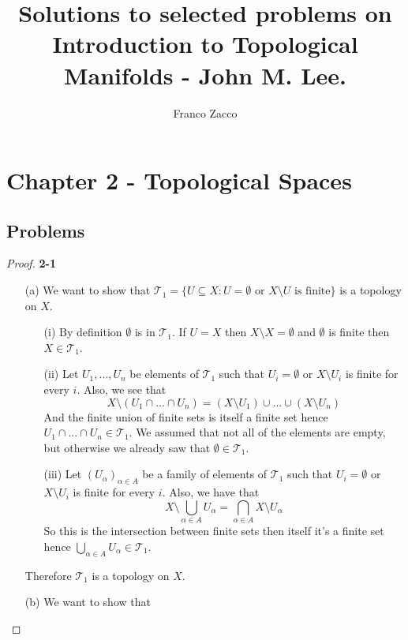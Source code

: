 \documentclass[11pt]{article}
\title{\textbf{Solutions to selected problems on Introduction to Topological Manifolds - John M. Lee.}}
\author{Franco Zacco}
\date{}
\newcommand{\Topo}{\mathcal{T}}
\theoremstyle{definition}
\begin{document}
\maketitle
\thispagestyle{empty}

\section*{Chapter 2 - Topological Spaces}

\subsection*{Problems}

\begin{proof}{\textbf{2-1}}
    \begin{itemize}
    \item [(a)] We want to show that
    $\Topo_1 = \{U \subseteq X: U = \emptyset \text{ or }X \setminus U \text{ is finite}\}$
    is a topology on $X$.
        \begin{itemize}
            \item [(i)] By definition $\emptyset$ is in $\Topo_1$. If $U = X$
            then $X \setminus X = \emptyset$ and $\emptyset$ is finite then
            $X \in \Topo_1$.
            \item [(ii)] Let $U_1, ..., U_n$ be elements of $\Topo_1$ such that
            $U_i = \emptyset$ or $X \setminus U_i$ is finite for every
            $i$. Also, we see that 
            $$X \setminus (U_1 \cap ... \cap U_n)
            = (X \setminus U_1) \cup ... \cup (X \setminus U_n)$$
            And the finite union of finite sets is 
            itself a finite set hence $U_1 \cap ... \cap U_n \in \Topo_1$.
            We assumed that not all of the elements are empty,  but otherwise
            we already saw that $\emptyset \in \Topo_1$.
            \item [(iii)] Let $(U_\alpha)_{\alpha \in A}$ be a family of
            elements of $\Topo_1$  such that
            $U_i = \emptyset$ or $X \setminus U_i$ is finite for every
            $i$. Also, we have that
            $$X \setminus \bigcup_{\alpha \in A} U_\alpha
            = \bigcap_{\alpha \in A} X \setminus U_\alpha$$
            So this is the intersection between finite sets then itself it's
            a finite set hence $\bigcup_{\alpha \in A} U_\alpha \in \Topo_1$.
        \end{itemize} 
        Therefore $\Topo_1$ is a topology on $X$.
        \item [(b)] We want to show that

\end{itemize}
\end{proof}
\end{document}
